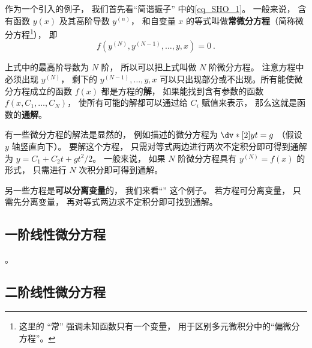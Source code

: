
\begin{issues}
\issueDraft
\end{issues}


作为一个引入的例子， 我们首先看“简谐振子” 中的\autoref{eq_SHO_1}。 一般来说， 含有函数 $y(x)$ 及其高阶导数 $y^{(n)}$， 和自变量 $x$ 的等式叫做\textbf{常微分方程}（简称微分方程\footnote{这里的 “常” 强调未知函数只有一个变量， 用于区别多元微积分中的“偏微分方程”。}）， 即
\begin{equation}
f(y^{(N)}, y^{(N-1)}, \dots, y, x) = 0~.
\end{equation}

上式中的最高阶导数为 $N$ 阶， 所以可以把上式叫做 $N$ 阶微分方程。 注意方程中必须出现 $y^{(N)}$， 剩下的 $y^{(N-1)}, \dots, y, x$ 可以只出现部分或不出现。所有能使微分方程成立的函数 $f(x)$ 都是方程的\textbf{解}， 如果能找到含有参数的函数 $f(x,C_1, \dots , C_N)$， 使所有可能的解都可以通过给 $C_i$ 赋值来表示， 那么这就是函数的\textbf{通解}。

有一些微分方程的解法是显然的， 例如描述的微分方程为 $\dv*[2]{y}{t} = g$ （假设 $y$ 轴竖直向下）。 要解这个方程， 只需对等式两边进行两次不定积分即可得到通解为 $y = C_1 + C_2 t + gt^2/2$。 一般来说， 如果 $N$ 阶微分方程具有 $y^{(N)} = f(x)$ 的形式， 只需进行 $N$ 次积分即可得到通解。

另一些方程是\textbf{可以分离变量}的， 我们来看“” 这个例子。 若方程可分离变量， 只需先分离变量， 再对等式两边求不定积分即可找到通解。



\subsection{一阶线性微分方程}
。

\subsection{二阶线性微分方程}

